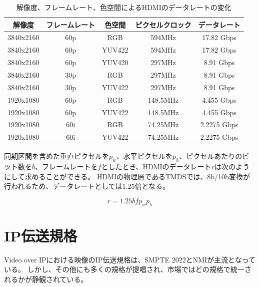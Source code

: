 \begin{table}[htbp]
  \caption{解像度、フレームレート、色空間によるHDMIのデータレートの変化}
  \label{tb:video-bandwidth}
  \begin{center}
  \begin{tabular}{c|c|c|c|c}
    \hline
    解像度     & フレームレート & 色空間  & ピクセルクロック & データレート  \\\hline\hline
    3840x2160 & 60p          & RGB    & 594MHz        & 17.82 Gbps  \\\hline
    3840x2160 & 60p          & YUV422 & 594MHz        & 17.82 Gbps  \\\hline
    3840x2160 & 60p          & YUV420 & 297MHz        & 8.91 Gbps   \\\hline
    3840x2160 & 30p          & RGB    & 297MHz        & 8.91 Gbps   \\\hline
    3840x2160 & 30p          & YUV422 & 297MHz        & 8.91 Gbps   \\\hline
    1920x1080 & 60p          & RGB    & 148.5MHz      & 4.455 Gbps  \\\hline
    1920x1080 & 60p          & YUV422 & 148.5MHz      & 4.455 Gbps  \\\hline
    1920x1080 & 60i          & RGB    & 74.25MHz      & 2.2275 Gbps \\\hline
    1920x1080 & 60i          & YUV422 & 74.25MHz      & 2.2275 Gbps \\\hline
  \end{tabular}\end{center}
\end{table}


\newpage
同期区間を含めた垂直ピクセルを$p_w$、水平ピクセルを$p_h$、ピクセルあたりのビット数を$b$、フレームレートを$f$としたとき、HDMIのデータレート$r$は次のようにして求めることができる。
HDMIの物理層であるTMDSでは、8b/10b変換が行われるため、データレートとしては1.25倍となる。

\[ r=1.25bfp_wp_h \]

\section{IP伝送規格}
Video over IPにおける映像のIP伝送規格は、SMPTE 2022とNMIが主流となっている\cite{kodera-interbee2016}。
しかし、その他にも多くの規格が提唱され、市場ではどの規格で統一されるかが静観されている。

